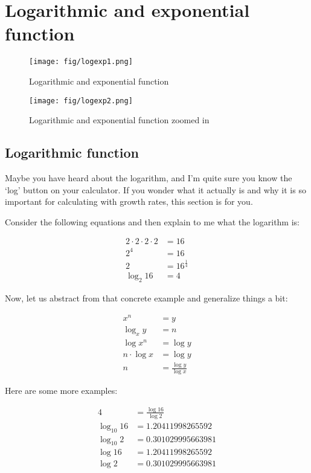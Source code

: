 \section{Logarithmic and exponential function}\label{logarithmic-and-exponential-function}

\begin{figure}
\centering
\texttt{[image: fig/logexp1.png]}
\caption{\label{fig:logexp1} Logarithmic and exponential function}
\end{figure}

\begin{figure}
\centering
\texttt{[image: fig/logexp2.png]}
\caption{\label{fig:logexp2} Logarithmic and exponential function zoomed in}
\end{figure}

\subsection{Logarithmic function}\label{logarithmic-function}

Maybe you have heard about the logarithm, and I'm quite sure you know the `log' button on your calculator. If you wonder what it actually is and why it is so important for calculating with growth rates, this section is for you.

Consider the following equations and then explain to me what the logarithm is:

\begin{align*}
2\cdot2\cdot2\cdot2 &= 16 \\
2^4 &= 16 \\
2 &= 16^{\frac{1}{4}} \\
\log_2 16 &= 4 
\end{align*}

Now, let us abstract from that concrete example and generalize things a bit:

\begin{align*}
x^n &= y \\
\log_x y &= n \\
\log x^n &= \log y \\
n\cdot \log x &= \log y \\
n &= \frac{\log y}{\log x} 
\end{align*}

Here are some more examples:

\begin{align*}
4 &= \frac{\log 16}{\log 2} \\
\log_{10}16 &= 1.20411998265592 \\
\log_{10}2 &= 0.301029995663981 \\
\log 16 &= 1.20411998265592 \\
\log 2 &= 0.301029995663981 \\
\end{align*}


